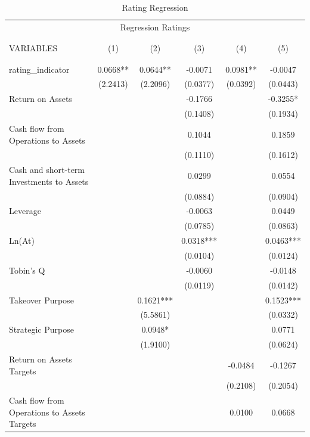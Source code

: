 \documentclass[12pt]{article}
\begin{document}
	\begin{table}[ht]
		\centering
		\caption{Rating Regression}

		\begin{adjustbox}{height=10cm, max width=\textwidth}
			\begin{tabular}{lccccc}
				\multicolumn{6}{c}{Regression Ratings} \\ \\ \hline
				  \\
				VARIABLES & (1) & (2) & (3) & (4) & (5) \\ \\ \hline
				 &  &  &  &  &  \\
				rating\_indicator & 0.0668** & 0.0644** & -0.0071 & 0.0981** & -0.0047 \\
				 & (2.2413) & (2.2096) & (0.0377) & (0.0392) & (0.0443) \\
				Return on Assets &  &  & -0.1766 &  & -0.3255* \\
				 &  &  & (0.1408) &  & (0.1934) \\
				Cash flow from Operations to Assets &  &  & 0.1044 &  & 0.1859 \\
				 &  &  & (0.1110) &  & (0.1612) \\
				Cash and short-term Investments to Assets &  &  & 0.0299 &  & 0.0554 \\
				 &  &  & (0.0884) &  & (0.0904) \\
				Leverage &  &  & -0.0063 &  & 0.0449 \\
				 &  &  & (0.0785) &  & (0.0863) \\
				Ln(At) &  &  & 0.0318*** &  & 0.0463*** \\
				 &  &  & (0.0104) &  & (0.0124) \\
				Tobin's Q &  &  & -0.0060 &  & -0.0148 \\
				 &  &  & (0.0119) &  & (0.0142) \\
				Takeover Purpose &  & 0.1621*** &  &  & 0.1523*** \\
				 &  & (5.5861) &  &  & (0.0332) \\
				Strategic Purpose &  & 0.0948* &  &  & 0.0771 \\
				 &  & (1.9100) &  &  & (0.0624) \\
				Return on Assets Targets &  &  &  & -0.0484 & -0.1267 \\
				 &  &  &  & (0.2108) & (0.2054) \\
				Cash flow from Operations to Assets Targets &  &  &  & 0.0100 & 0.0668 \\

\end{tabular}
\end{adjustbox}
\end{table}
\end{document}
